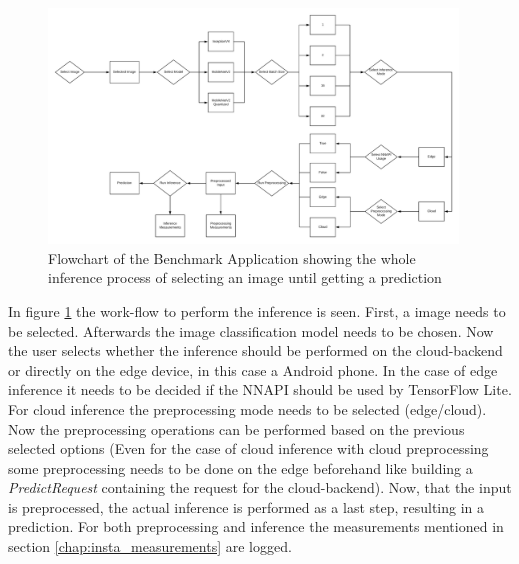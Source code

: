 \begin{figure}[htb]
\centering
\includegraphics[width=0.97\textwidth]{./Bilder/FlowChart_App.png}
\caption{Flowchart of the Benchmark Application showing the whole inference process of selecting an image until getting a prediction}
\label{fig:app}
\end{figure}
In figure \ref{fig:app} the work-flow to perform the inference is seen. First, a image needs to be selected. Afterwards the image classification model needs to be chosen. Now the user selects whether the inference should be performed on the cloud-backend or directly on the edge device, in this case a Android phone. In the case of edge inference it needs to be decided if the NNAPI should be used by TensorFlow Lite. For cloud inference the preprocessing mode needs to be selected (edge/cloud). Now the preprocessing operations can be performed based on the previous selected options (Even for the case of cloud inference with cloud preprocessing some preprocessing needs to be done on the edge beforehand like building a \emph{PredictRequest} containing the request for the cloud-backend). Now, that the input is preprocessed, the actual inference is performed as a last step, resulting in a prediction. For both preprocessing and inference the measurements mentioned in section \ref{chap:insta_measurements} are logged.

